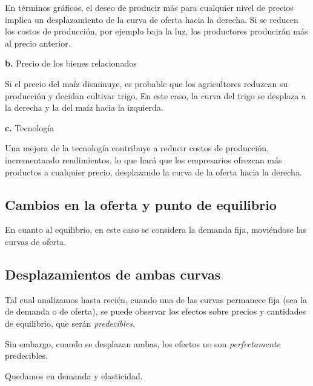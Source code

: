En términos gráficos, el deseo de producir más para cualquier nivel de precios 
implica un desplazamiento de la curva de oferta hacia la derecha.
Si se reducen los costos de producción,
por ejemplo baja la luz,
los productores producirán más al precio anterior.

\textbf{b.} Precio de los bienes relacionados 

Si el precio del maíz disminuye,
es probable que los agricultores reduzcan su producción y decidan cultivar trigo.
En este caso, la curva del trigo se desplaza a la derecha y la del maíz hacia la izquierda.

\textbf{c.} Tecnología

Una mejora de la tecnología contribuye a reducir costos de producción,
incrementando rendimientos,
lo que hará que los empresarios ofrezcan más productos a cualquier precio,
desplazando la curva de la oferta hacia la derecha.

\subsection{Cambios en la oferta y punto de equilibrio}

En cuanto al equilibrio, en este caso se considera la demanda fija,
moviéndose las curvas de oferta.

\subsection{Desplazamientos de ambas curvas}

Tal cual analizamos hasta recién,
cuando una de las curvas permanece fija
(sea la de demanda o de oferta),
se puede observar los efectos sobre precios y cantidades de equilibrio,
que serán \textit{predecibles}.

Sin embargo,
cuando se desplazan ambas,
los efectos no son \textit{perfectamente} predecibles.

Quedamos en demanda y elasticidad.